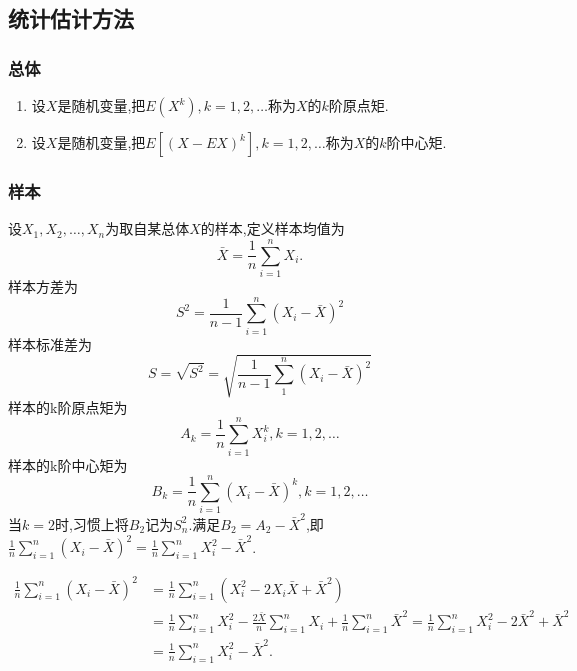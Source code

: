\subsection{统计估计方法}
\subsubsection{总体}
\begin{enumerate}
    \item 设$X$是随机变量,把$E(X^k),k=1,2,\dots$称为$X$的$k$阶原点矩.
    \item 设$X$是随机变量,把$E\left[(X-EX)^k\right] ,k=1,2,\dots$称为$X$的$k$阶中心矩.
\end{enumerate}
\subsubsection{样本}
设$X_1,X_2,\dotsc,X_n$为取自某总体$X$的样本,定义样本均值为
\begin{equation*}
\bar{X}=\frac{1}{n}\sum_{i=1}^{n}X_i.
\end{equation*}
样本方差为
\begin{equation*}
    S^2=\frac{1}{n-1}\sum^{n}_{i=1}(X_i-\bar{X})^2
\end{equation*}
样本标准差为
\begin{equation*}
    S=\sqrt{S^2}=\sqrt{\frac{1}{n-1}\sum^{n}_{1}(X_i-\bar{X})^2}
\end{equation*}
样本的k阶原点矩为
\begin{equation*}
A_k=\frac{1}{n}\sum^{n}_{i=1}X_i^k,k=1,2,\dots
\end{equation*}
样本的k阶中心矩为
\begin{equation*}
B_k=\frac{1}{n}\sum^{n}_{i=1}(X_i-\bar{X})^k,k=1,2,\dots
\end{equation*}
当$k=2$时,习惯上将$B_2$记为$S_n^2$.满足$B_2=A_2-\bar{X}^2$,即$\frac{1}{n}\sum^{n}_{i=1}(X_i-\bar{X})^2=\frac{1}{n}\sum^{n}_{i=1}X_i^2-\bar{X}^2$.
\begin{prf}[$\frac{1}{n}\sum^{n}_{i=1}(X_i-\bar{X})^2=\frac{1}{n}\sum^{n}_{i=1}X_i^2-\bar{X}^2$]
\begin{align*}
    \frac{1}{n}\sum^{n}_{i=1}(X_i-\bar{X})^2&=\frac{1}{n}\sum^{n}_{i=1}(X_i^2-2X_i\bar{X}+\bar{X}^2) \\
    &=\frac{1}{n}\sum^{n}_{i=1}X_i^2-\frac{2\bar{X}}{n}\sum^{n}_{i=1}X_i+\frac{1}{n}\sum^{n}_{i=1}\bar{X}^2=\frac{1}{n}\sum^{n}_{i=1}X_i^2-2\bar{X}^2+\bar{X}^2 \\
    &=\frac{1}{n}\sum^{n}_{i=1}X_i^2-\bar{X}^2.
\end{align*}
\end{prf}
